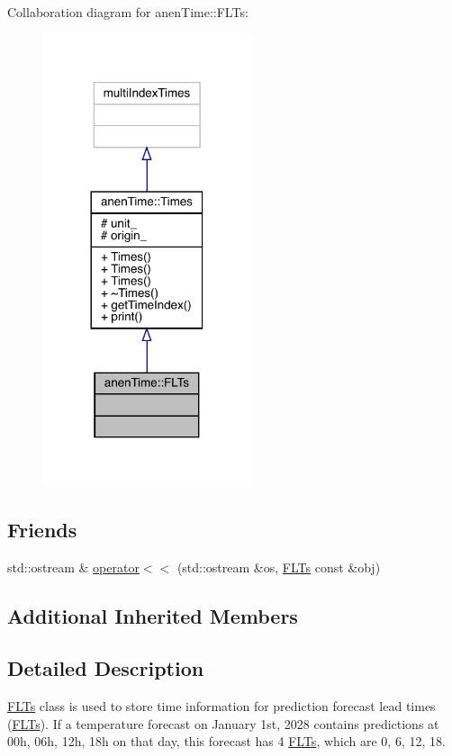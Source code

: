 Collaboration diagram for anen\+Time\+:\+:F\+L\+Ts\+:\nopagebreak
\begin{figure}[H]
\begin{center}
\leavevmode
\includegraphics[width=173pt]{classanen_time_1_1_f_l_ts__coll__graph}
\end{center}
\end{figure}
\subsection*{Friends}
\begin{DoxyCompactItemize}
\item 
std\+::ostream \& \mbox{\hyperlink{classanen_time_1_1_f_l_ts_ae6eedde5f18b77e7a2922bc9a3f6b8bf}{operator$<$$<$}} (std\+::ostream \&os, \mbox{\hyperlink{classanen_time_1_1_f_l_ts}{F\+L\+Ts}} const \&obj)
\end{DoxyCompactItemize}
\subsection*{Additional Inherited Members}


\subsection{Detailed Description}
\mbox{\hyperlink{classanen_time_1_1_f_l_ts}{F\+L\+Ts}} class is used to store time information for prediction forecast lead times (\mbox{\hyperlink{classanen_time_1_1_f_l_ts}{F\+L\+Ts}}). If a temperature forecast on January 1st, 2028 contains predictions at 00h, 06h, 12h, 18h on that day, this forecast has 4 \mbox{\hyperlink{classanen_time_1_1_f_l_ts}{F\+L\+Ts}}, which are 0, 6, 12, 18. 

